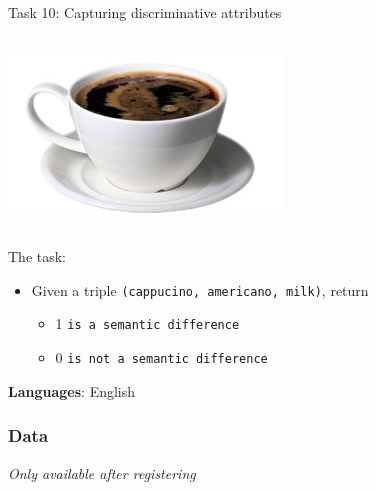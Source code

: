 \documentclass[10pt, compress]{beamer}
\begin{document}
\begin{frame}{Task 10: Capturing discriminative attributes}
\begin{columns}
\begin{column}{0.3\textwidth}
    \includegraphics[width=\textwidth]{graphics/discrim-americano.jpg}
  \end{column}
\end{columns}

The task:
\begin{itemize}
  \item Given a triple {\tt (cappucino, americano, milk)}, return
  \begin{itemize}
  \item 1 {\tt is a semantic difference}
  \item 0 {\tt is not a semantic difference}
  \end{itemize}
\end{itemize}

\textbf{Languages}: English

\end{frame}

\begin{frame}
\frametitle{Data}

\emph{Only available after registering}

\end{frame}
\end{document}
